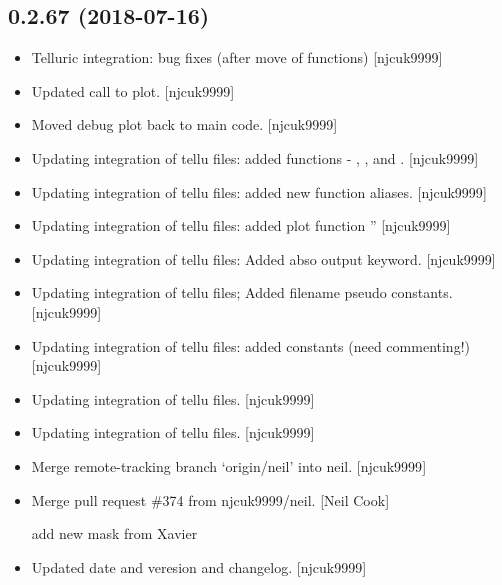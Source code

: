 \documentclass[a4paper,10pt,english]{report}
\begin{document}
\subsection{0.2.67 (2018-07-16)}
\label{\detokenize{misc/changelog:id391}}\begin{itemize}
\item {} 
Telluric integration: bug fixes (after move of functions) {[}njcuk9999{]}

\item {} 
Updated call to plot. {[}njcuk9999{]}

\item {} 
Moved debug plot back to main code. {[}njcuk9999{]}

\item {} 
Updating integration of tellu files: added functions -
, ,
 and . {[}njcuk9999{]}

\item {} 
Updating integration of tellu files: added new function aliases.
{[}njcuk9999{]}

\item {} 
Updating integration of tellu files: added plot function
” {[}njcuk9999{]}

\item {} 
Updating integration of tellu files: Added abso output keyword.
{[}njcuk9999{]}

\item {} 
Updating integration of tellu files; Added filename pseudo constants.
{[}njcuk9999{]}

\item {} 
Updating integration of tellu files: added constants (need
commenting!) {[}njcuk9999{]}

\item {} 
Updating integration of tellu files. {[}njcuk9999{]}

\item {} 
Updating integration of tellu files. {[}njcuk9999{]}

\item {} 
Merge remote-tracking branch ‘origin/neil’ into neil. {[}njcuk9999{]}

\item {} 
Merge pull request \#374 from njcuk9999/neil. {[}Neil Cook{]}

add new mask from Xavier

\item {} 
Updated date and veresion and changelog. {[}njcuk9999{]}

\end{itemize}
\end{document}
